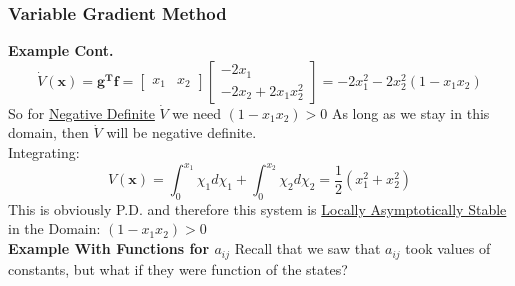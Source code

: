 \documentclass[11pt,handout]{beamer}   %
\begin{document}
\begin{frame}
\frametitle{Variable Gradient Method}
\small
\textbf{Example Cont.}
\begin{equation*}
\dot{V}(\mathbf{x}) = \mathbf{g^T f} = \begin{bmatrix}
x_1 & x_2
\end{bmatrix}
\begin{bmatrix}
-2 x_1 \\ -2 x_2 + 2 x_1 x_2^2
\end{bmatrix} = -2x_1^2 - 2x_2^2 (1-x_1x_2)
\end{equation*}
So for \underline{Negative Definite} $\dot{V}$ we need $(1-x_1 x_2)>0$ As long as we stay in this domain, then $\dot{V}$ will be negative definite.\\
\vspace{6pt}
Integrating:
\begin{equation*}
V(\mathbf{x}) = \int_0^{x_1} \chi_1 d\chi_1 + \int_0^{x_2} \chi_2 d\chi_2 = \frac{1}{2}(x_1^2 + x_2^2)
\end{equation*}
This is obviously P.D. and therefore this system is \underline{Locally Asymptotically Stable} in the Domain: $(1-x_1x_2)>0$\\
\vspace{6pt}
\textbf{Example With Functions for $a_{ij}$}
Recall that we saw that $a_{ij}$ took values of constants, but what if they were function of the states?\\
\end{frame}
\end{document}
